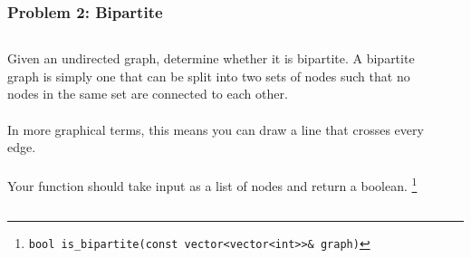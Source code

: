 \documentclass[aspectratio=169]{beamer}
\newcommand{\code}{\texttt}
\begin{document}
\begin{frame}
    \frametitle{Problem 2: Bipartite}
    \begin{columns}
        \begin{column}{0.5\textwidth}
            Given an undirected graph, determine whether it is bipartite.
            A bipartite graph is simply one that can be split into two sets
            of nodes such that no nodes in the same set are connected to each
            other.
            \\~\\
            In more graphical terms, this means you can draw a line that crosses every edge.
            \\~\\
            Your function should take input as a list of nodes and return a
            boolean. \footnote[frame]{\code{bool is\_bipartite(const vector<vector<int>>\& graph)}}
        \end{column}
        \begin{column}{0.5\textwidth}
            \centering
            
        \end{column}
    \end{columns}
    

\end{frame}
\end{document}
